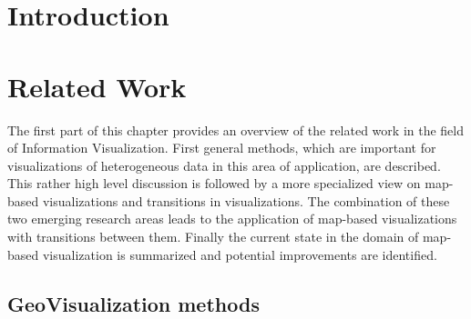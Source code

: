 \section{Introduction}

\section{Related Work}
The first part of this chapter provides an overview of the related work in the field of
Information Visualization. First general methods, which are important for visualizations of heterogeneous data in this area of application, are described. This rather high level discussion is followed by a more specialized view on map-based visualizations and transitions in visualizations. The combination of these two emerging research areas leads to the application of map-based visualizations with transitions between them. Finally the current state in the domain of map-based visualization is summarized and potential improvements are identified.

\subsection{GeoVisualization methods}



